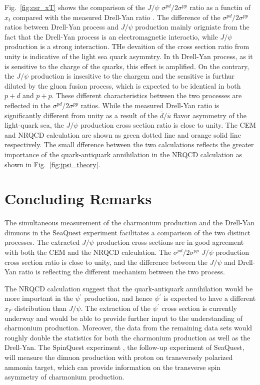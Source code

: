 \documentclass[10pt,a4paper,final]{article}
\begin{document}
Fig.~\ref{fig:csr_xT} shows the comparison of the $J/\psi$ $\sigma^{pd}/2\sigma^{pp}$ ratio
as a functin of $x_t$ compared with the measured Drell-Yan ratio \cite{dove2021}.
The difference of the $\sigma^{pd}/2\sigma^{pp}$ ratios between Drell-Yan process and $J/\psi$ 
production mainly origniate from the fact that the Drell-Yan process is an electromagnetic 
interactio, while $J/\psi$ production is a strong interaction. THe devaition of the cross
section ratio from unity is indicative of the light sea quark asymmtry. In th Drell-Yan
process, as it is sensitive to the charge of the quarks, this effect is amplified.
On the contrary, the $J/\psi$ production is insesitive to the chargem and the sensitive is
furthur diluted by the gluon fusion process, which is expected to be identical in both $p+d$ and $p+p$.
These
different characteristics between the two processes are reflected in the
$\sigma^{pd}/2\sigma^{pp}$ ratios. While the measured Drell-Yan ratio
is significantly different from unity as a result of the $\bar{d}/\bar{u}$
flavor asymmetry of the light-quark sea, the $J/\psi$ production cross section ratio
is close to unity.
The CEM and NRQCD calculation are shown as green dotted line and orange solid line
respectively. The small dfference between the two calculations reflects the greater
importance of the quark-antiquark annihilation in the NRQCD calculation as shown in
Fig.~\ref{fig:jpsi_theory}.

\section{Concluding Remarks}
The simultaneous measurement of the charmonium production and the Drell-Yan dimuons
in the SeaQuest experiment facilitates a comparison of the two distinct processes. The
extracted $J/\psi$ production cross sections are in good agreement with both the CEM
and the NRQCD calculation. The $\sigma^{pd}/2\sigma^{pp}$ $J/\psi$ production cross section ratio
is close to unity, and the difference between the $J/\psi$ and Drell-Yan
ratio is reflecting the different mechanism between the two process.

The NRQCD calculation suggest that the quark-antiquark annihilation would
be more important in the $\psi^\prime$ production, and hence $\psi^\prime$ is expected
to have a different $x_F$ distribution than $J/\psi$. The extraction of the $\psi^\prime$
cross section is currently underway and would be able to provide further input to
the understanding of charmonium production. Moreover, the data from the remaining
data sets would roughly double the statistics for both the charmonium production as well as the Drell-Yan.
The SpinQuest experiment \cite{geesaman2014}, the follow-up experiment of SeaQuest, will measure the dimuon
production with proton on transversely polarized ammonia target, which can provide information
on the transverse spin asymmetry of charmonium production.

\printbibliography[heading=bibintoc,title={References}]
\end{document}

